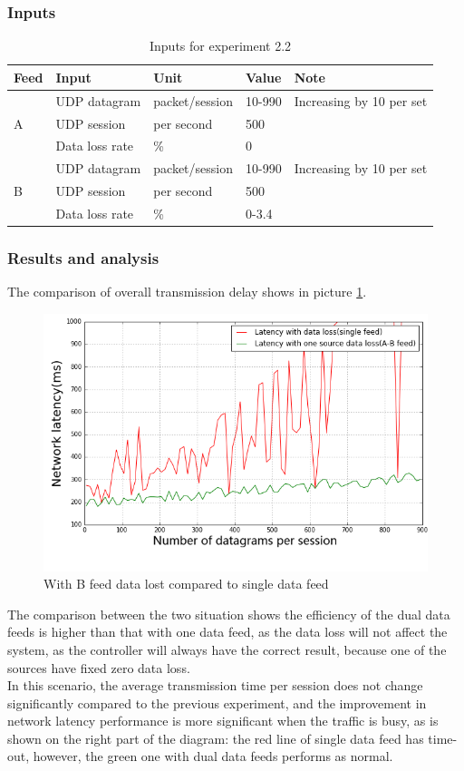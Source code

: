 \documentclass[11pt,openright,a4paper]{report}
\begin{document}
\subsubsection{Inputs}
\begin{table}[H]
	\centering
	\caption{Inputs for experiment 2.2}
	\label{my-label}
	\begin{tabular}{@{}lllll@{}}
		\toprule
		Feed & Input          & Unit           & Value  & Note                     \\ \midrule
		& UDP datagram   & packet/session & 10-990 & Increasing by 10 per set \\
		A    & UDP session    & per second     & 500    &                          \\
		& Data loss rate & \%             & 0      &                          \\ \midrule
		& UDP datagram   & packet/session & 10-990 & Increasing by 10 per set \\
		B    & UDP session    & per second     & 500    &                          \\
		& Data loss rate & \%             & 0-3.4  &                          \\ \bottomrule
	\end{tabular}
\end{table}
\subsubsection{Results and analysis}
The comparison of overall transmission delay shows in picture \ref{fig:oneDataLost}.\\
\begin{figure}[H]
\centering
\includegraphics[width=0.7\linewidth]{picture/experiments/exp2/oneDataLost}
\caption{With B feed data lost compared to single data feed}
\label{fig:oneDataLost}
\end{figure}
The comparison between the two situation shows the efficiency of the dual data feeds is higher than that with one data feed, as the data loss will not affect the system, as the controller will always have the correct result, because one of the sources have fixed zero data loss.\\
In this scenario, the average transmission time per session does not change significantly compared to the previous experiment, and the improvement in network latency performance is more significant when the traffic is busy, as is shown on the right part of the diagram: the red line of single data feed has time-out, however, the green one with dual data feeds performs as normal.\\
\end{document}
